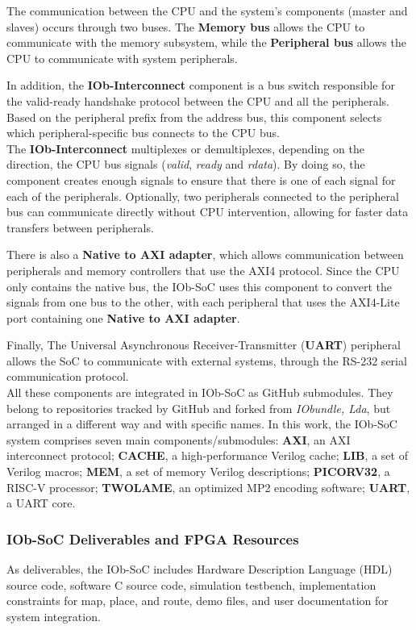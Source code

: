 The communication between the CPU and the system’s components (master and slaves) occurs through two buses. The \textbf{Memory bus} allows the CPU to communicate with the memory subsystem, while the \textbf{Peripheral bus} allows the CPU to communicate with system peripherals.

In addition, the \textbf{IOb-Interconnect} component is a bus switch responsible for the valid-ready handshake protocol between the CPU and all the peripherals. Based on the peripheral prefix from the address bus, this component selects which peripheral-specific bus connects to the CPU bus. \\
The \textbf{IOb-Interconnect} multiplexes or demultiplexes, depending on the direction, the CPU bus signals (\textit{valid}, \textit{ready} and \textit{rdata}). By doing so, the component creates enough signals to ensure that there is one of each signal for each of the peripherals. Optionally, two peripherals connected to the peripheral bus can communicate directly without CPU intervention, allowing for faster data transfers between peripherals.

There is also a \textbf{Native to AXI adapter}, which allows communication between peripherals and memory controllers that use the AXI4 protocol. Since the CPU only contains the native bus, the IOb-SoC uses this component to convert the signals from one bus to the other, with each peripheral that uses the AXI4-Lite port containing one \textbf{Native to AXI adapter}.

Finally, The Universal Asynchronous Receiver-Transmitter (\textbf{\textbf{UART}}) peripheral allows the SoC to communicate with external systems, through the RS-232 serial communication protocol. \\

All these components are integrated in IOb-SoC as GitHub submodules. They belong to repositories tracked by GitHub and forked from \textit{IObundle, Lda}, but arranged in a different way and with specific names.
In this work, the IOb-SoC system comprises seven main components/submodules: \textbf{AXI}, an AXI interconnect protocol;
\textbf{CACHE}, a high-performance Verilog cache; \textbf{LIB}, a set of Verilog macros; \textbf{MEM}, a set of memory Verilog descriptions; \textbf{PICORV32}, a RISC-V processor; \textbf{TWOLAME}, an optimized MP2 encoding software; \textbf{UART}, a UART core. 

\subsubsection{IOb-SoC Deliverables and FPGA Resources}
As deliverables, the IOb-SoC includes Hardware Description Language (HDL) source code, software C source code, simulation testbench, implementation constraints for map, place, and route, demo files, and user documentation for system integration.


